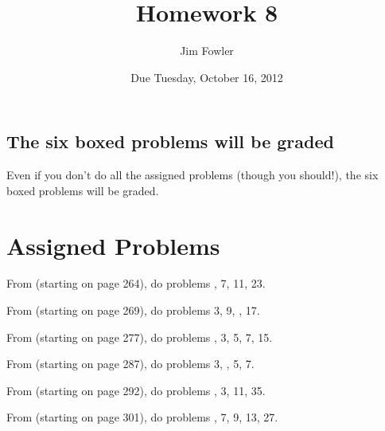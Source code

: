 \documentclass[12pt]{handout}
\title{Homework 8}
\date{Due Tuesday, October 16, 2012}
\author{Jim Fowler}
\begin{document}
\maketitle










\subsection*{The six boxed problems will be graded}
Even if you don't do all the assigned problems (though you should!), the six boxed problems will be graded.

\section*{Assigned Problems}

From  (starting on page 264),
do problems , 7, 11, 23.
\vspace{1ex}

From  (starting on page 269),
do problems 3, 9, , 17.
\vspace{1ex}

From  (starting on page 277),
do problems , 3, 5, 7, 15.
\vspace{1ex}

From  (starting on page 287),
do problems 3, , 5, 7.
\vspace{1ex}

From  (starting on page 292),
do problems , 3, 11, 35.
\vspace{1ex}

From  (starting on page 301),
do problems , 7, 9, 13, 27.
\vspace{1ex}
\end{document}

